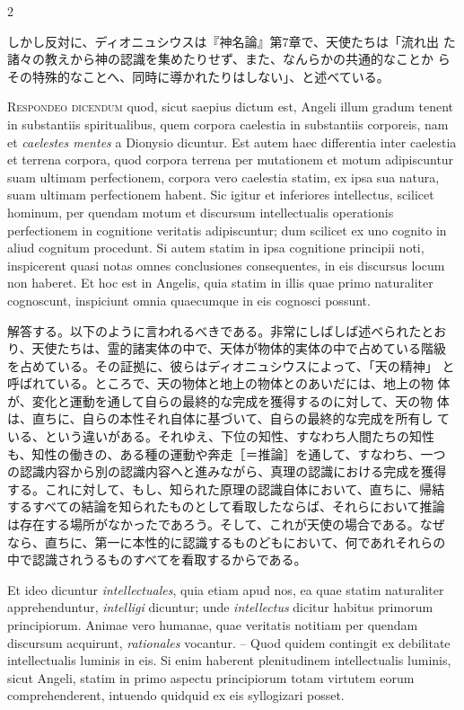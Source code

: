 \documentclass[paper=a4paper,fontsize=10pt,jafontsize=9pt,titlepage]{jlreq}
\begin{document}
\begin{paracol}{2}
\switchcolumn

しかし反対に、ディオニュシウスは『神名論』第7章で、天使たちは「流れ出
た諸々の教えから神の認識を集めたりせず、また、なんらかの共通的なことか
らその特殊的なことへ、同時に導かれたりはしない」、と述べている。

\switchcolumn*

{\scshape Respondeo dicendum} quod, sicut saepius dictum est, Angeli
illum gradum tenent in substantiis spiritualibus, quem corpora
caelestia in substantiis corporeis, nam et {\itshape caelestes mentes}
a Dionysio dicuntur. Est autem haec differentia inter caelestia et
terrena corpora, quod corpora terrena per mutationem et motum
adipiscuntur suam ultimam perfectionem, corpora vero caelestia statim,
ex ipsa sua natura, suam ultimam perfectionem habent. Sic igitur et
inferiores intellectus, scilicet hominum, per quendam motum et
discursum intellectualis operationis perfectionem in cognitione
veritatis adipiscuntur; dum scilicet ex uno cognito in aliud cognitum
procedunt. Si autem statim in ipsa cognitione principii noti,
inspicerent quasi notas omnes conclusiones consequentes, in eis
discursus locum non haberet. Et hoc est in Angelis, quia statim in
illis quae primo naturaliter cognoscunt, inspiciunt omnia quaecumque
in eis cognosci possunt.

\switchcolumn

解答する。以下のように言われるべきである。非常にしばしば述べられたとお
り、天使たちは、霊的諸実体の中で、天体が物体的実体の中で占めている階級
を占めている。その証拠に、彼らはディオニュシウスによって、「天の精神」
と呼ばれている。ところで、天の物体と地上の物体とのあいだには、地上の物
体が、変化と運動を通して自らの最終的な完成を獲得するのに対して、天の物
体は、直ちに、自らの本性それ自体に基づいて、自らの最終的な完成を所有し
ている、という違いがある。それゆえ、下位の知性、すなわち人間たちの知性
も、知性の働きの、ある種の運動や奔走［＝推論］を通して、すなわち、一つ
の認識内容から別の認識内容へと進みながら、真理の認識における完成を獲得
する。これに対して、もし、知られた原理の認識自体において、直ちに、帰結
するすべての結論を知られたものとして看取したならば、それらにおいて推論
は存在する場所がなかったであろう。そして、これが天使の場合である。なぜ
なら、直ちに、第一に本性的に認識するものどもにおいて、何であれそれらの
中で認識されうるものすべてを看取するからである。

\switchcolumn*

Et ideo dicuntur {\itshape intellectuales}, quia etiam apud nos, ea
quae statim naturaliter apprehenduntur, {\itshape intelligi} dicuntur;
unde {\itshape intellectus} dicitur habitus primorum
principiorum. Animae vero humanae, quae veritatis notitiam per quendam
discursum acquirunt, {\itshape rationales} vocantur. -- Quod quidem
contingit ex debilitate intellectualis luminis in eis. Si enim
haberent plenitudinem intellectualis luminis, sicut Angeli, statim in
primo aspectu principiorum totam virtutem eorum comprehenderent,
intuendo quidquid ex eis syllogizari posset.


\end{paracol}
\end{document}
